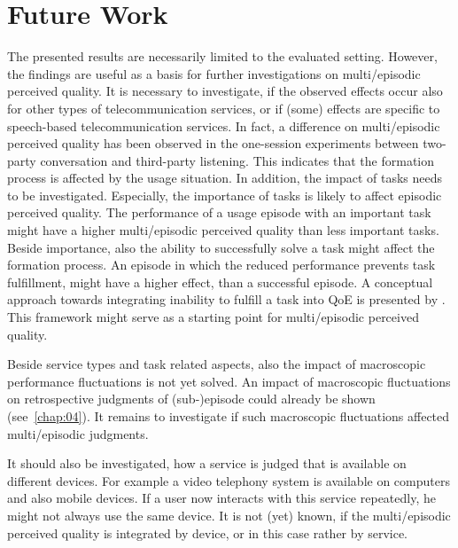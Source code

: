 \section{Future Work}
The presented results are necessarily limited to the evaluated setting.
However, the findings are useful as a basis for further investigations on multi\-/episodic perceived quality.
It is necessary to investigate, if the observed effects occur also for other types of telecommunication services, or if (some) effects are specific to speech-based telecommunication services.
In fact, a difference on multi\-/episodic perceived quality has been observed in the one-session experiments between two-party conversation and third-party listening.
This indicates that the formation process is affected by the usage situation.
In addition, the impact of tasks needs to be investigated.
Especially, the importance of tasks is likely to affect episodic perceived quality.
The performance of a usage episode with an important task might have a higher multi\-/episodic perceived quality than less important tasks.
Beside importance, also the ability to successfully solve a task might affect the formation process.
An episode in which the reduced performance prevents task fulfillment, might have a higher effect, than a successful episode.
A conceptual approach towards integrating inability to fulfill a task into \ac{QoE} is presented by \citet{leon-garcia_generalizing_2014}.
This framework might serve as a starting point for multi\-/episodic perceived quality.

Beside service types and task related aspects, also the impact of macroscopic performance fluctuations is not yet solved.
An impact of macroscopic fluctuations on retrospective judgments of (sub-)episode could already be shown (see~\autoref{chap:04}).
It remains to investigate if such macroscopic fluctuations affected multi\-/episodic judgments.

It should also be investigated, how a service is judged that is available on different devices.
For example a video telephony system is available on computers and also mobile devices.
If a user now interacts with this service repeatedly, he might not always use the same device.
It is not (yet) known, if the multi\-/episodic perceived quality is integrated by device, or in this case rather by service.